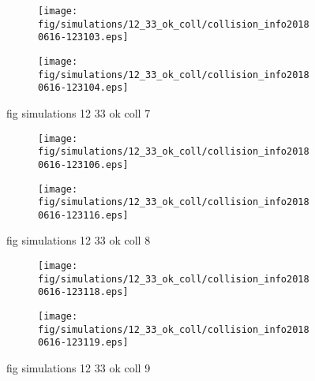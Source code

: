 \begin{figure}[H]
	\centering
	\begin{subfigure}[b]{0.8\textwidth}
		\texttt{[image: fig/simulations/12\_33\_ok\_coll/collision\_info20180616-123103.eps]}
		\caption{}
		\label{fig:simulations:12_33_ok_coll:collision_info20180616-123103}
	\end{subfigure}

	\begin{subfigure}[b]{0.8\textwidth}
		\texttt{[image: fig/simulations/12\_33\_ok\_coll/collision\_info20180616-123104.eps]}
		\caption{}
		\label{fig:simulations:12_33_ok_coll:collision_info20180616-123104}
	\end{subfigure}
	\caption{fig simulations 12 33 ok coll 7}
	\label{fig:simulations:12_33_ok_coll:7}
\end{figure}

\begin{figure}[H]
	\centering
	\begin{subfigure}[b]{0.8\textwidth}
		\texttt{[image: fig/simulations/12\_33\_ok\_coll/collision\_info20180616-123106.eps]}
		\caption{}
		\label{fig:simulations:12_33_ok_coll:collision_info20180616-123106}
	\end{subfigure}

	\begin{subfigure}[b]{0.8\textwidth}
		\texttt{[image: fig/simulations/12\_33\_ok\_coll/collision\_info20180616-123116.eps]}
		\caption{}
		\label{fig:simulations:12_33_ok_coll:collision_info20180616-123116}
	\end{subfigure}
	\caption{fig simulations 12 33 ok coll 8}
	\label{fig:simulations:12_33_ok_coll:8}
\end{figure}

\begin{figure}[H]
	\centering
	\begin{subfigure}[b]{0.8\textwidth}
		\texttt{[image: fig/simulations/12\_33\_ok\_coll/collision\_info20180616-123118.eps]}
		\caption{}
		\label{fig:simulations:12_33_ok_coll:collision_info20180616-123118}
	\end{subfigure}

	\begin{subfigure}[b]{0.8\textwidth}
		\texttt{[image: fig/simulations/12\_33\_ok\_coll/collision\_info20180616-123119.eps]}
		\caption{}
		\label{fig:simulations:12_33_ok_coll:collision_info20180616-123119}
	\end{subfigure}
	\caption{fig simulations 12 33 ok coll 9}
	\label{fig:simulations:12_33_ok_coll:9}
\end{figure}


